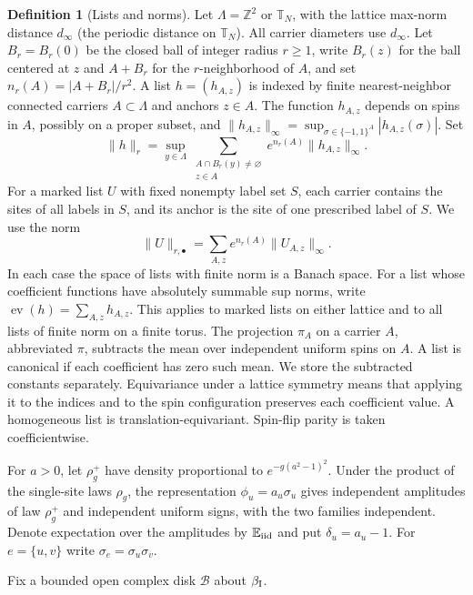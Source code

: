 \documentclass[11pt]{article}
\newcommand{\E}{\mathbb E}
\theoremstyle{definition}
\newtheorem{definition}[proposition]{Definition}
\begin{document}
\begin{definition}[Lists and norms]
\label{def:list-norms}
Let \(\Lambda=\mathbb Z^2\) or \(\mathbb T_N\), with the lattice
max-norm distance \(d_\infty\) (the periodic distance on
\(\mathbb T_N\)). All carrier diameters use \(d_\infty\).
Let \(B_r=B_r(0)\) be the closed ball of integer radius \(r\ge1\),
write \(B_r(z)\) for the ball centered at \(z\) and \(A+B_r\) for
the \(r\)-neighborhood of \(A\), and set
\(n_r(A)=|A+B_r|/r^2\). A list \(h=(h_{A,z})\) is indexed by
finite nearest-neighbor connected carriers \(A\subset\Lambda\)
and anchors \(z\in A\). The function \(h_{A,z}\) depends on
spins in \(A\), possibly on a proper subset, and
\(\|h_{A,z}\|_\infty=\sup_{\sigma\in\{-1,1\}^A}|h_{A,z}(\sigma)|\).
Set
\[
 \|h\|_r=\sup_{y\in\Lambda}
    \sum_{\substack{A\cap B_r(y)\ne\varnothing\\z\in A}}
       e^{n_r(A)}\|h_{A,z}\|_\infty.
\]
For a marked list \(U\) with fixed nonempty label set \(S\), each
carrier contains the sites of all labels in \(S\), and its anchor
is the site of one prescribed label of \(S\). We use the norm
\[
 \|U\|_{r,\bullet}=\sum_{A,z}e^{n_r(A)}\|U_{A,z}\|_\infty .
\]
In each case the space of lists with finite norm is a Banach space.
For a list whose coefficient functions have absolutely summable
sup norms, write \(\operatorname{ev}(h)=\sum_{A,z}h_{A,z}\).
This applies to marked lists on either lattice and to all lists
of finite norm on a finite torus. The projection \(\pi_A\)
on a carrier \(A\), abbreviated \(\pi\), subtracts the mean
over independent uniform spins on \(A\). A list is canonical if
each coefficient has zero such mean. We store the subtracted
constants separately. Equivariance under a lattice symmetry means
that applying it to the indices and to the spin configuration
preserves each coefficient value. A homogeneous list is
translation-equivariant. Spin-flip parity is taken coefficientwise.
\end{definition}

For \(a>0\), let
\(\rho_g^+\) have density proportional to \(e^{-g(a^2-1)^2}\).
Under the product of the single-site laws \(\rho_g\),
the representation \(\phi_u=a_u\sigma_u\) gives independent
amplitudes of law \(\rho_g^+\) and independent uniform signs,
with the two families independent. Denote expectation over the
amplitudes by \(\E_{\rm iid}\) and put \(\delta_u=a_u-1\).
For \(e=\{u,v\}\) write \(\sigma_e=\sigma_u\sigma_v\).

Fix a bounded open complex disk \(\mathcal B\) about \(\beta_{\rm I}\).
\end{document}
